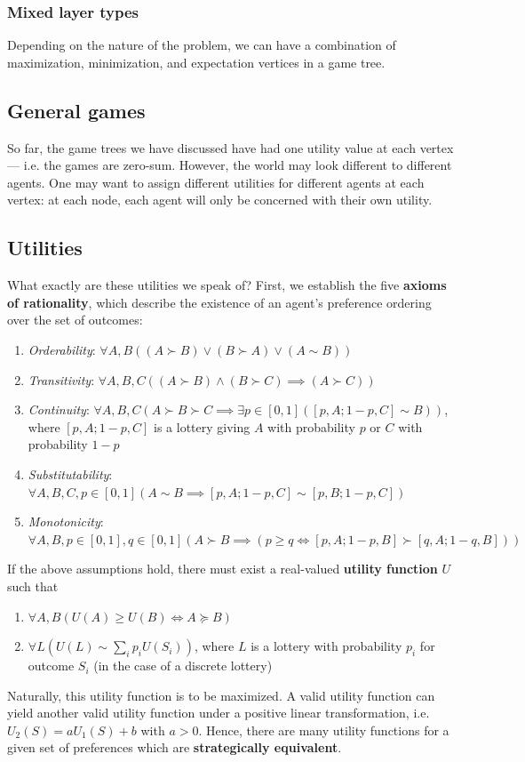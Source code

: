 \documentclass[12pt]{article}
\begin{document}
\subsubsection{Mixed layer types}

Depending on the nature of the problem, we can have a combination of maximization, minimization, and expectation vertices in a game tree.

\subsection{General games}

So far, the game trees we have discussed have had one utility value at each vertex --- i.e. the games are zero-sum. However, the world may look different to different agents. One may want to assign different utilities for different agents at each vertex: at each node, each agent will only be concerned with their own utility.

\subsection{Utilities}

What exactly are these utilities we speak of? First, we establish the five \textbf{axioms of rationality}, which describe the existence of an agent's preference ordering over the set of outcomes:
\begin{enumerate}
\item \textit{Orderability}: $\forall A, B \left((A \succ B) \vee (B \succ A) \vee (A \sim B)\right)$
\item \textit{Transitivity}: $\forall A, B, C \left((A \succ B) \wedge (B \succ C) \implies (A \succ C)\right)$
\item \textit{Continuity}: $\forall A, B, C (A \succ B \succ C \implies \exists p \in [0, 1] ([p, A; 1 - p, C] \sim B))$, where $[p, A; 1 - p, C]$ is a lottery giving $A$ with probability $p$ or $C$ with probability $1 - p$
\item \textit{Substitutability}: $\forall A, B, C, p \in [0, 1] (A \sim B \implies [p, A; 1 - p, C] \sim [p, B; 1 - p, C])$
\item \textit{Monotonicity}: $\forall A, B, p \in [0, 1], q \in [0, 1] (A \succ B \implies (p \geq q \iff [p, A; 1 - p, B] \succ [q, A; 1 - q, B]))$
\end{enumerate}
If the above assumptions hold, there must exist a real-valued \textbf{utility function} $U$ such that
\begin{enumerate}
\item $\forall A, B (U(A) \geq U(B) \iff A \succeq B)$
\item $\forall L (U(L) \sim \sum_i p_i U(S_i))$, where $L$ is a lottery with probability $p_i$ for outcome $S_i$ (in the case of a discrete lottery)
\end{enumerate}
Naturally, this utility function is to be maximized. A valid utility function can yield another valid utility function under a positive linear transformation, i.e. $U_2(S) = aU_1(S) + b$ with $a > 0$. Hence, there are many utility functions for a given set of preferences which are \textbf{strategically equivalent}.
\end{document}
